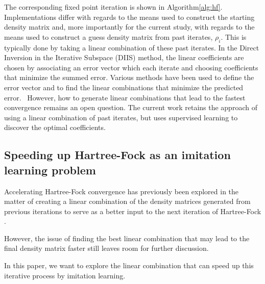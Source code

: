 \documentclass[twoside,11pt]{article}
\begin{document}
The corresponding fixed point iteration is shown in Algorithm\ref{alg:hf}. Implementations differ with regards to the means used to construct the starting density matrix and, more importantly for the current study, with regards to the means used to construct a guess density matrix from past iterates, $\rho_i$. This is typically done by taking a linear combination of these past iterates. In the Direct Inversion in the Iterative Subspace (DIIS) method\citep{Pulay1980}, the linear coefficients are chosen by associating an error vector which each iterate and choosing coefficients that minimize the summed error. Various methods have been used to define the error vector and to find the linear combinations that minimize the predicted error.~\citep{ADIIS,compScuseria,Alejandro2012} However, how to generate linear combinations that lead to the fastest convergence remains an open question\citep{Konstantin2002, Thorsten2011}. The current work retains the approach of using a linear combination of past iterates, but uses supervised learning to discover the optimal coefficients. 

\subsection{Speeding up Hartree-Fock as an imitation learning problem}

Accelerating Hartree-Fock convergence has previously been explored in the matter of creating a linear combination of the density matrices generated from previous iterations to serve as a better input to the next iteration of Hartree-Fock \citep{Pulay1980}. 


However, the issue of finding the best linear combination that may lead to the final density matrix faster still leaves room for further discussion.

In this paper,
we want to explore the linear combination that can speed up this iterative process by imitation learning. 



\end{document}
